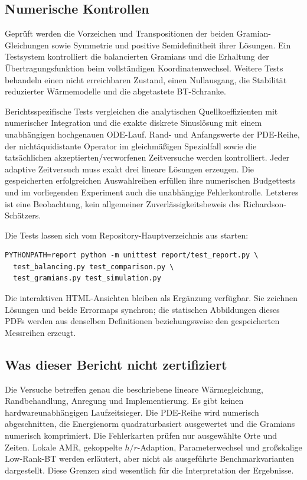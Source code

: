 \subsection{Numerische Kontrollen}
Geprüft werden die Vorzeichen und Transpositionen der beiden Gramian-Gleichungen sowie Symmetrie und positive Semidefinitheit ihrer Lösungen. Ein Testsystem kontrolliert die balancierten Gramians und die Erhaltung der Übertragungsfunktion beim vollständigen Koordinatenwechsel. Weitere Tests behandeln einen nicht erreichbaren Zustand, einen Nullausgang, die Stabilität reduzierter Wärmemodelle und die abgetastete BT-Schranke.

Berichtsspezifische Tests vergleichen die analytischen Quellkoeffizienten mit numerischer Integration und die exakte diskrete Sinuslösung mit einem unabhängigen hochgenauen ODE-Lauf. Rand- und Anfangswerte der PDE-Reihe, der nichtäquidistante Operator im gleichmäßigen Spezialfall sowie die tatsächlichen akzeptierten/verworfenen Zeitversuche werden kontrolliert. Jeder adaptive Zeitversuch muss exakt drei lineare Lösungen erzeugen. Die gespeicherten erfolgreichen Auswahlreihen erfüllen ihre numerischen Budgettests und im vorliegenden Experiment auch die unabhängige Fehlerkontrolle. Letzteres ist eine Beobachtung, kein allgemeiner Zuverlässigkeitsbeweis des Richardson-Schätzers.

Die Tests lassen sich vom Repository-Hauptverzeichnis aus starten:
\begin{verbatim}
PYTHONPATH=report python -m unittest report/test_report.py \
  test_balancing.py test_comparison.py \
  test_gramians.py test_simulation.py
\end{verbatim}
Die interaktiven HTML-Ansichten bleiben als Ergänzung verfügbar. Sie zeichnen Lösungen und beide Errormaps synchron; die statischen Abbildungen dieses PDFs werden aus denselben Definitionen beziehungsweise den gespeicherten Messreihen erzeugt.

\subsection{Was dieser Bericht nicht zertifiziert}
Die Versuche betreffen genau die beschriebene lineare Wärmegleichung, Randbehandlung, Anregung und Implementierung. Es gibt keinen hardwareunabhängigen Laufzeitsieger. Die PDE-Reihe wird numerisch abgeschnitten, die Energienorm quadraturbasiert ausgewertet und die Gramians numerisch komprimiert. Die Fehlerkarten prüfen nur ausgewählte Orte und Zeiten. Lokale AMR, gekoppelte $h/r$-Adaption, Parameterwechsel und großskalige Low-Rank-BT werden erläutert, aber nicht als ausgeführte Benchmarkvarianten dargestellt. Diese Grenzen sind wesentlich für die Interpretation der Ergebnisse.

